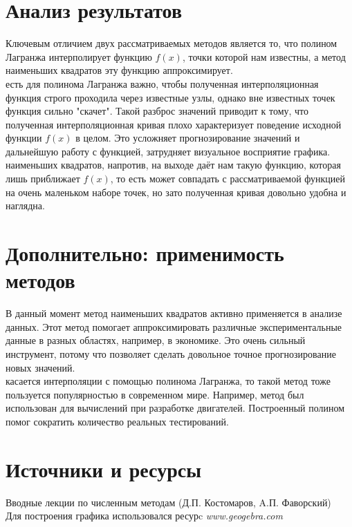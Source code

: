 \documentclass[a4paper, 14pt]{extreport}
\begin{document}
\section*{Анализ результатов}
\;\;\;\;\;\;Ключевым отличием двух рассматриваемых методов является то, что полином Лагранжа интерполирует функцию $f(x)$, точки которой нам известны, а метод наименьших квадратов эту функцию аппроксимирует. \\
 есть для полинома Лагранжа важно, чтобы полученная интерполяционная функция строго проходила через известные узлы, однако вне известных точек функция сильно "скачет". Такой разброс значений приводит к тому, что полученная интерполяционная кривая плохо характеризует поведение исходной функции $f(x)$ в целом. Это усложняет прогнозирование значений и дальнейшую работу с функцией, затрудняет визуальное восприятие графика.\\
 наименьших квадратов, напротив, на выходе даёт нам такую функцию, которая лишь приближает $f(x)$, то есть может совпадать с рассматриваемой функцией на очень маленьком наборе точек, но зато полученная кривая довольно удобна и наглядна. 

\section*{Дополнительно: применимость методов}
\;\;\;\;\;\;В данный момент метод наименьших квадратов активно применяется в анализе данных. Этот метод помогает аппроксимировать различные экспериментальные данные в разных областях, например, в экономике. Это очень сильный инструмент, потому что позволяет сделать довольное точное прогнозирование новых значений. \\
 касается интерполяции с помощью полинома Лагранжа, то такой метод тоже пользуется популярностью в современном мире. Например, метод был использован для вычислений при разработке двигателей. Построенный полином помог сократить количество реальных тестирований.

\section*{Источники и ресурсы}
Вводные лекции по численным методам (Д.П. Костомаров, A.П. Фаворский) \\
Для построения графика использовался ресурc \textit{www.geogebra.com}
\end{document}
